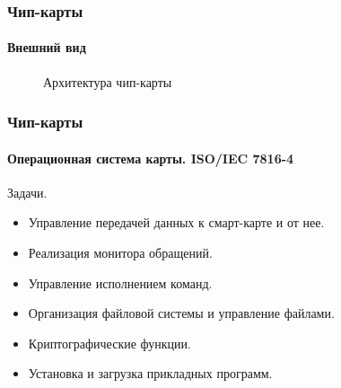 \begin{frame}
    \frametitle{Чип-карты}
    \framesubtitle{Внешний вид}
    
    \begin{figure}
        \begin{center}
            \caption{Архитектура чип-карты}\label{pict:chipcard}
        \end{center}
    \end{figure} 
    
\end{frame}


\begin{frame}
    \frametitle{Чип-карты}
    \framesubtitle{Операционная система карты. ISO/IEC 7816-4}
    Задачи.
    \begin{itemize}
        \item Управление передачей данных к смарт-карте и от нее.
        \item Реализация монитора обращений.
        \item Управление исполнением команд.
        \item Организация файловой системы и управление файлами.
        \item Криптографические функции.
        \item Установка и загрузка прикладных программ. 
    \end{itemize}
\end{frame}

